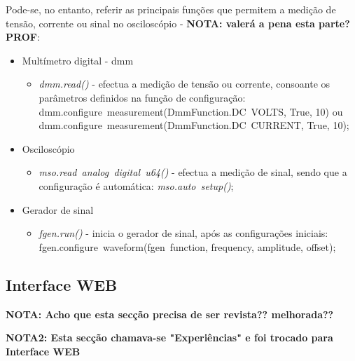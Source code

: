 Pode-se, no entanto, referir as principais funções que permitem a medição de tensão, corrente ou sinal no osciloscópio \cite{pyvirtualbench} - \textbf{NOTA: valerá a pena esta parte? PROF}:

\begin{itemize}
	\item Multímetro digital - \acrshort{dmm}
		\begin{itemize}
			\item \textit{dmm.read()} - efectua a medição de tensão ou corrente, consoante os parâmetros definidos na função de configuração: dmm.configure~\textunderscore measurement(DmmFunction.DC~\textunderscore VOLTS, True, 10) ou dmm.configure~\textunderscore measurement(DmmFunction.DC~\textunderscore CURRENT, True, 10);
		\end{itemize}
	\item Osciloscópio
	\begin{itemize}
		\item \textit{mso.read~\textunderscore analog~\textunderscore digital~\textunderscore u64()} - efectua a medição de sinal, sendo que a configuração é automática: \textit{mso.auto~\textunderscore setup()};
	\end{itemize}
	\item Gerador de sinal
	\begin{itemize}
		\item \textit{fgen.run()} - inicia o gerador de sinal, após as configurações iniciais:\\fgen.configure~\textunderscore waveform(fgen~\textunderscore function, frequency, amplitude, offset);
	\end{itemize}
\end{itemize}

\subsection{Interface WEB}
\label{sec:interfaceweb}
\textbf{NOTA: Acho que esta secção precisa de ser revista?? melhorada??}

\textbf{NOTA2: Esta secção chamava-se "Experiências" e foi trocado para Interface WEB}

